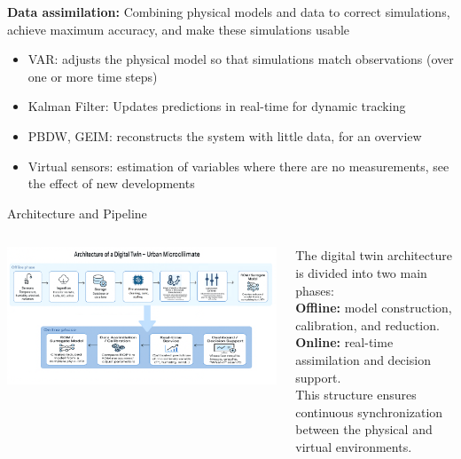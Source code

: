\documentclass{beamer}
\begin{document}
\begin{frame}
    \small
    \textbf{Data assimilation:} Combining physical models and data to correct simulations, achieve maximum accuracy, and make these simulations usable %
    \vspace{0.2cm}
    \begin{itemize}
        \item VAR: adjusts the physical model so that simulations match observations (over one or more time steps)
        \item Kalman Filter: Updates predictions in real-time for dynamic tracking
        \item PBDW, GEIM: reconstructs the system with little data, for an overview
        \item Virtual sensors: estimation of variables where there are no measurements, see the effect of new developments
    \end{itemize}
\end{frame}

\begin{frame}{Architecture and Pipeline}
\begin{columns}
    \begin{column}{0.55\textwidth}
        \includegraphics[width=\linewidth]{images/architecture_of_digital_twin.png}
    \end{column}
    \begin{column}{0.45\textwidth}
        \small
        The digital twin architecture is divided into two main phases:\\[4pt]
        \textbf{Offline:} model construction, calibration, and reduction.\\[3pt]
        \textbf{Online:} real-time assimilation and decision support.\\[4pt]
        This structure ensures continuous synchronization between the physical and virtual environments.
    \end{column}
\end{columns}
\end{frame}
\end{document}
